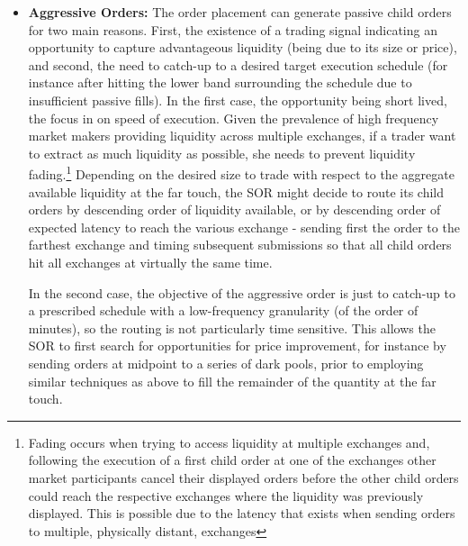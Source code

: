 \begin{itemize}
\item \textbf{Aggressive Orders:} The order placement can generate passive child orders for two main reasons. First, the existence of a trading signal indicating an opportunity to capture advantageous liquidity (being due to its size or price), and second, the need to catch-up to a desired target execution schedule (for instance after hitting the lower band surrounding the schedule due to insufficient passive fills). In the first case, the opportunity being short lived, the focus in on speed of execution. Given the prevalence of high frequency market makers providing liquidity across multiple exchanges, if a trader want to extract as much liquidity as possible, she needs to prevent liquidity fading.\footnote{Fading occurs when trying to access liquidity at multiple exchanges and, following the execution of a first child order at one of the exchanges other market participants cancel their displayed orders before the other child orders could reach the respective exchanges where the liquidity was previously displayed. This is possible due to the latency that exists when sending orders to multiple, physically distant, exchanges} Depending on the desired size to trade with respect to the aggregate available liquidity at the far touch, the SOR might decide to route its child orders by descending order of liquidity available, or by descending order of expected latency to reach the various exchange - sending first the order to the farthest exchange and timing subsequent submissions so that all child orders hit all exchanges at virtually the same time. 


In the second case, the objective of the aggressive order is just to catch-up to a prescribed schedule with a low-frequency granularity (of the order of minutes), so the routing is not particularly time sensitive. This allows the SOR to first search for opportunities for price improvement, for instance by sending orders at midpoint to a series of dark pools, prior to employing similar techniques as above to fill the remainder of the quantity at the far touch.



\end{itemize}
